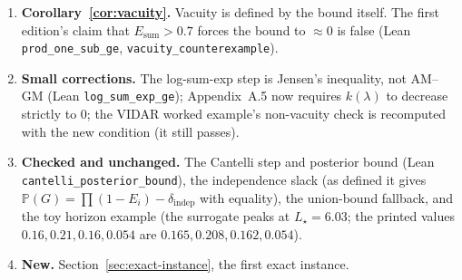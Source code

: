 \documentclass[11pt]{article}
\newcommand{\Prob}{\mathbb{P}}
\theoremstyle{remark}
\theoremstyle{plain}
\begin{document}
\begin{sloppypar}
\begin{enumerate}[label=D\arabic*.]
    assumption is stated; the Cantelli moments are those conditional on $G$. The first edition inferred the posterior
    on $H$ from $H \subseteq \{S > s_\star\}$ alone.
  \item \textbf{Corollary~\ref{cor:vacuity}.} Vacuity is defined by the bound itself. The first edition's claim that
    $E_{\mathrm{sum}} > 0.7$ forces the bound to $\approx 0$ is false (Lean \texttt{prod\_one\_sub\_ge},
    \texttt{vacuity\_counterexample}).
  \item \textbf{Small corrections.} The log-sum-exp step is Jensen's inequality, not AM--GM (Lean
    \texttt{log\_sum\_exp\_ge}); Appendix~A.5 now requires $k(\lambda)$ to decrease strictly to $0$; the VIDAR
    worked example's non-vacuity check is recomputed with the new condition (it still passes).
  \item \textbf{Checked and unchanged.} The Cantelli step and posterior bound (Lean \nolinkurl{cantelli_posterior_bound}),
    the independence slack (as defined it gives $\Prob(G) = \prod(1-E_i) - \delta_{\mathrm{indep}}$ with equality),
    the union-bound fallback, and the toy horizon example (the surrogate peaks at $L_\star = 6.03$; the printed
    values $0.16, 0.21, 0.16, 0.054$ are $0.165, 0.208, 0.162, 0.054$).
  \item \textbf{New.} Section~\ref{sec:exact-instance}, the first exact instance.
\end{enumerate}
\end{sloppypar}
\end{document}
